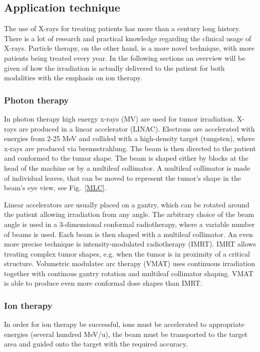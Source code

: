 \documentclass[type=dr, dr=rernat, accentcolor=tud7b,colorbacktitle, bigchapter, openright, twoside, 12pt ]{tudthesis}
\begin{document}
\subsection{Application technique}

The use of X-rays for treating patients has more than a century long history. There is a lot of research and practical knowledge regarding the clinical usage of X-rays. Particle therapy, on the other hand, is a more novel technique, with
more patients being treated every year. In the following sections an overview will be given of how the irradiation is actually delivered to the patient for both modalities with the emphasis on ion therapy.

\subsubsection{Photon therapy}

In photon therapy high energy x-rays (MV) are used for tumor irradiation. X-rays are produced in a linear accelerator (LINAC). Electrons are accelerated with energies from 2-25 MeV and collided with a high-density target (tungsten), where
x-rays are produced via bremsstrahlung. The beam is then directed to the patient and conformed to the tumor shape. The beam is shaped either by blocks at the head of the machine or by a multileaf collimator. A multileaf collimator is made of
individual leaves, that can be moved to represent the tumor's shape in the beam's eye view, see Fig.~\ref{MLC}.

Linear accelerators are usually placed on a gantry, which can be rotated around the patient allowing irradiation from any angle. 
The arbitrary choice of the beam angle is used in a 3-dimensional conformal radiotherapy, where a variable number of beams is used. 
Each beam is then shaped with a multileaf collimator. An even more precise technique is intensity-modulated radiotherapy (IMRT). IMRT allows treating complex tumor shapes, e.g. when the tumor is in proximity of a critical structure.
Volumetric modulatec arc therapy (VMAT) uses continuous irradiation together with continous gantry rotation and multileaf collimator shaping. VMAT is able to produce even more conformal dose shapes than IMRT.

\subsubsection{Ion therapy}

In order for ion therapy be successful, ions must be accelerated to appropriate energies (several hundred MeV/u), the beam must be transported to the target area and guided
onto the target with the required accuracy.
\end{document}
